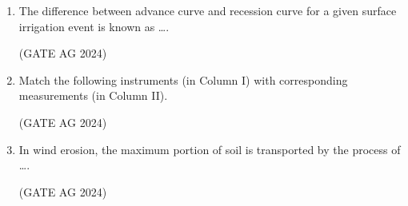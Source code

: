 \documentclass[journal]{IEEEtran}
\begin{document}
\begin{enumerate}
 \medskip

\item 
The difference between advance curve and recession curve for a given surface irrigation event is known as \dots.

\begin{enumerate}
\end{enumerate}
 \hfill(GATE AG 2024)\\

 \medskip


\item 
Match the following instruments (in Column I) with corresponding measurements (in Column II).



\begin{enumerate}
\end{enumerate}
 \hfill(GATE AG 2024)\\

 \medskip

\item
In wind erosion, the maximum portion of soil is transported by the process of \dots.
    \begin{enumerate}
    \end{enumerate}
     \hfill(GATE AG 2024)\\


\end{enumerate}
\end{document}
